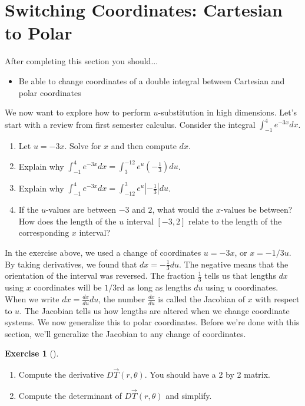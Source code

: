 \documentclass[10pt,]{book}
\theoremstyle{plain}
\theoremstyle{definition}
\theoremstyle{definition}
\theoremstyle{definition}
\theoremstyle{definition}
\newtheorem{exploration}[project]{Exercise}
\theoremstyle{definition}
\numberwithin{equation}{section}
\newcommand{\ds}{\displaystyle}
\begin{document}
\section[{Switching Coordinates: Cartesian to Polar}]{Switching Coordinates: Cartesian to Polar}\label{section-39}
After completing this section you should... \leavevmode%
\begin{itemize}[label=\textbullet]
\item{}Be able to change coordinates of a double integral between Cartesian and polar coordinates%
\end{itemize}
%
\par
We now want to explore how to perform \(u\)-substitution in high dimensions. Let's start with a review from first semester calculus.%
Consider the integral \(\ds\int_{-1}^4 e^{-3x} dx\). \leavevmode%
\begin{enumerate}
\item\hypertarget{li-182}{}Let \(u=-3x\).  Solve for \(x\) and then compute \(dx\).%
\item\hypertarget{li-183}{}Explain why \(\ds\int_{-1}^4 e^{-3x} dx=\int_{3}^{-12}e^u \left(-\frac{1}{3}\right)du\).%
\item\hypertarget{li-184}{}Explain why \(\ds\int_{-1}^4 e^{-3x} dx=\int_{-12}^{3}e^u \left|-\frac{1}{3}\right| du\).%
\item\hypertarget{li-185}{}If the \(u\)-values are between \(-3\) and \(2\), what would the \(x\)-values be between? How does the  length of the \(u\) interval \([-3,2]\) relate to the length of the corresponding \(x\) interval?%
\end{enumerate}
%
In the exercise above, we used a change of coordinates \(u=-3x\), or \(x=-1/3 u\). By taking derivatives, we found that \(dx=-\frac{1}{3}du\). The negative means that the orientation of the interval was reversed. The fraction \(\frac13\) tells us that lengths \(dx\) using \(x\) coordinates will be \(1/3\)rd as long as lengths \(du\) using \(u\) coordinates. When we write \(dx = \frac{dx}{du}du\), the number \(\frac{dx}{du}\) is called the Jacobian of \(x\) with respect to \(u\). The Jacobian tells us how lengths are altered when we change coordinate systems. We now generalize this to polar coordinates. Before we're done with this section, we'll generalize the Jacobian to any change of coordinates.%
\begin{exploration}[]\label{exploration-262}
\leavevmode%
\begin{enumerate}[font=\bfseries,label=(\alph*),ref=\alph*]
\item\label{task-714} Compute the derivative \(D\vec T(r,\theta)\).  You should have a 2 by 2 matrix.%
\item\label{task-715} Compute the determinant of \(D\vec T(r,\theta)\) and simplify.%
\end{enumerate}
\end{exploration}
\end{document}
